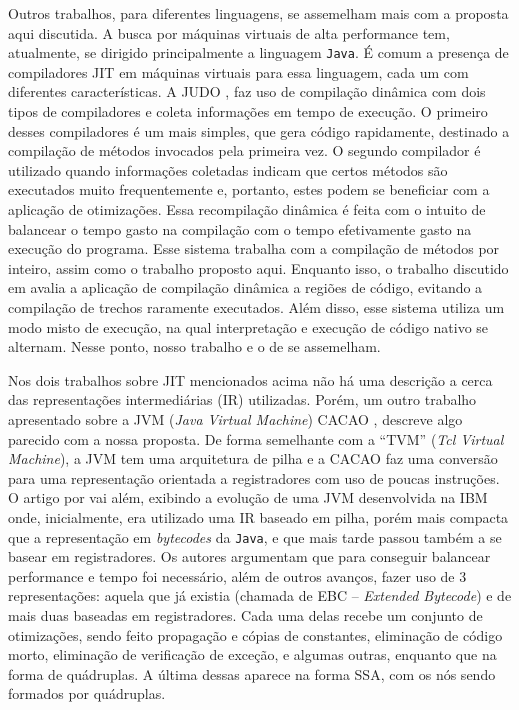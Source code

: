 Outros trabalhos, para diferentes linguagens, se assemelham mais com a
proposta aqui discutida. A busca por máquinas virtuais de alta
performance tem, atualmente, se dirigido principalmente a linguagem
\texttt{Java}. É comum a presença de compiladores JIT em máquinas
virtuais para essa linguagem, cada um com diferentes
características. A JUDO \cite{judo}, faz uso
de compilação dinâmica com dois tipos de compiladores e coleta
informações em tempo de execução. O primeiro desses compiladores é um
mais simples, que gera código rapidamente, destinado a compilação
de métodos invocados pela primeira vez. O segundo compilador é
utilizado quando informações coletadas indicam que certos métodos
são executados muito frequentemente e, portanto, estes podem se
beneficiar com a aplicação de otimizações. Essa recompilação dinâmica
é feita com o intuito de balancear o tempo gasto na compilação com o tempo
efetivamente gasto na execução do programa. Esse sistema trabalha com
a compilação de métodos por inteiro, assim como o trabalho proposto
aqui. Enquanto isso, o trabalho discutido em 
avalia a aplicação de compilação dinâmica a regiões de código, evitando
a compilação de trechos raramente executados. Além disso, esse sistema
utiliza um modo misto de execução, na qual interpretação e execução de
código nativo se alternam. Nesse ponto, nosso trabalho e o de
 se assemelham.

Nos dois trabalhos sobre JIT mencionados acima não há uma descrição
a cerca das representações intermediárias (IR) utilizadas. Porém, um
outro trabalho
apresentado sobre a JVM (\textit{Java Virtual Machine}) CACAO \cite{cacao},
descreve algo parecido com a nossa proposta. De forma semelhante com a
``TVM'' (\textit{Tcl Virtual Machine}), a JVM tem uma arquitetura de
pilha e a CACAO faz uma conversão para uma representação orientada a
registradores com uso de poucas instruções. O artigo por
 vai além, exibindo a evolução de uma JVM
desenvolvida na IBM onde, inicialmente, era utilizado uma IR baseado
em pilha, porém mais compacta que a representação em \textit{bytecodes} da
\texttt{Java}, e que mais tarde passou também a se basear em
registradores. Os autores argumentam que para conseguir balancear
performance e tempo foi necessário, além de outros avanços, fazer uso
de 3 representações: aquela que já existia (chamada de EBC --
\textit{Extended Bytecode}) e de mais duas baseadas em
registradores. Cada uma delas recebe um conjunto de otimizações, sendo
feito propagação e cópias de constantes, eliminação de código morto,
eliminação de verificação de exceção, e algumas outras, enquanto que na
forma de quádruplas. A última dessas aparece na forma SSA, com os nós
sendo formados por quádruplas.


